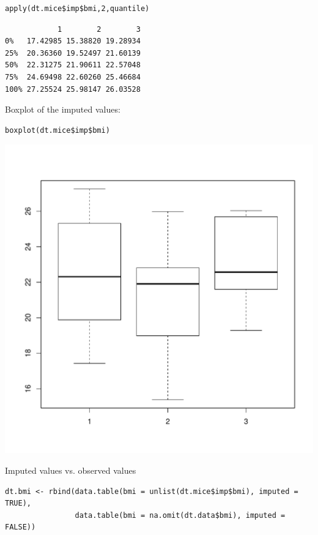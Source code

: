 \documentclass[12pt]{article}
\begin{document}
\lstset{language=r,label= ,caption= ,captionpos=b,numbers=none}
\begin{lstlisting}
apply(dt.mice$imp$bmi,2,quantile)
\end{lstlisting}

\begin{verbatim}
            1        2        3
0%   17.42985 15.38820 19.28934
25%  20.36360 19.52497 21.60139
50%  22.31275 21.90611 22.57048
75%  24.69498 22.60260 25.46684
100% 27.25524 25.98147 26.03528
\end{verbatim}

Boxplot of the imputed values:

\lstset{language=r,label= ,caption= ,captionpos=b,numbers=none}
\begin{lstlisting}
boxplot(dt.mice$imp$bmi)
\end{lstlisting}

\begin{center}
\includegraphics[width=.9\linewidth]{./boxplotImputed.pdf}
\end{center}

Imputed values vs. observed values
\lstset{language=r,label= ,caption= ,captionpos=b,numbers=none}
\begin{lstlisting}
dt.bmi <- rbind(data.table(bmi = unlist(dt.mice$imp$bmi), imputed = TRUE),
				data.table(bmi = na.omit(dt.data$bmi), imputed = FALSE))
\end{lstlisting}
\end{document}
